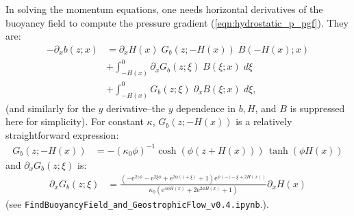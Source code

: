 \documentclass[10pt]{amsart}
\begin{document}
In solving the momentum equations, one needs horizontal derivatives of the buoyancy field to compute the pressure gradient (\ref{eqn:hydrostatic_p_pgf}).
They are:
\begin{align}
- \partial_x b(z; x) &= \partial_x H(x)\;  G_b(z; -H(x)) \; B(-H(x); x)    \nonumber \\
&+  \int_{-H(x)}^{0} \partial_x G_b(z; \xi) \; B(\xi; x) \; d \xi  \nonumber \\
&+ \int_{-H(x)}^{0} G_b(z; \xi) \; \partial_x B(\xi; x) \; d \xi  ,
\end{align}
(and similarly for the $y$ derivative--the $y$ dependence in $b, H$, and $B$ is suppressed here for simplicity).
For constant $\kappa$, $G_b(z; -H(x))$ is a relatively straightforward expression:
\begin{align}
G_b(z; -H(x)) & = 
-(\kappa_0 \phi)^{-1} \cosh \left( \phi (z + H(x)) \right) \, \tanh \left( \phi H(x) \right) 
\end{align}
and $\partial_x G_b(z; \xi)$ is:
\begin{align}
\partial_x G_b(z; \xi) & = 
\frac{\left(- \mathrm{e}^{2 z \phi} - \mathrm{e}^{2 \xi \phi} + \mathrm{e}^{2 \phi \left(z + \xi\right)} + 1\right) \mathrm{e}^{\phi \left(- z - \xi + 2 H{\left(x \right)}\right)} }{\kappa_0 \left(\mathrm{e}^{4 \phi H{\left(x \right)}} + 2 \mathrm{e}^{2 \phi H{\left(x \right)}} + 1\right)} \partial_x H{\left(x \right)} 
\end{align}
(see \texttt{FindBuoyancyField\_and\_GeostrophicFlow\_v0.4.ipynb}.).



\end{document}
